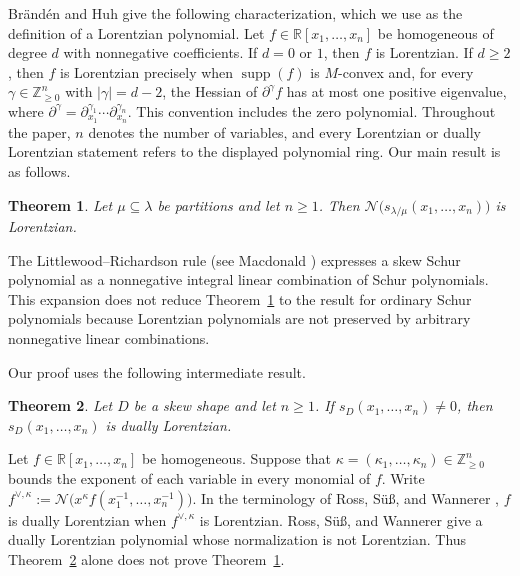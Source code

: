 \documentclass[11pt]{article}
\newtheorem{theorem}{Theorem}[section]
\theoremstyle{definition}
\newcommand{\Nop}{\mathcal N}
\newcommand{\R}{\mathbb R}
\newcommand{\Znonneg}{\mathbb Z_{\ge0}}
\newcommand{\supp}{\operatorname{supp}}
\begin{document}
Br\"and\'en and Huh
\cite[Definition~2.6 and Theorem~2.25]{BH} give the following characterization,
which we use as the definition of a Lorentzian polynomial.  Let
$f\in\R[x_1,\ldots,x_n]$ be homogeneous of degree $d$ with nonnegative
coefficients.  If $d=0$ or $1$, then $f$ is Lorentzian.  If $d\ge2$, then $f$
is Lorentzian precisely when $\supp(f)$ is $M$-convex and, for every
$\gamma\in\Znonneg^n$ with $|\gamma|=d-2$, the Hessian of
$\partial^\gamma f$ has at most one positive eigenvalue, where
$\partial^\gamma=\partial_{x_1}^{\gamma_1}\cdots
\partial_{x_n}^{\gamma_n}$.  This convention includes the zero polynomial.
Throughout the paper, $n$ denotes the number of variables, and every
Lorentzian or dually Lorentzian statement refers to the displayed polynomial
ring.  Our main result is as follows.

\begin{theorem}\label{thm:main}
Let $\mu\subseteq\lambda$ be partitions and let $n\ge1$.  Then
$\Nop\bigl(s_{\lambda/\mu}(x_1,\ldots,x_n)\bigr)$ is Lorentzian.
\end{theorem}

The Littlewood--Richardson rule (see Macdonald
\cite[Chapter~I]{Macdonald}) expresses a skew Schur polynomial as a
nonnegative integral linear combination of Schur polynomials.  This expansion
does not reduce Theorem~\ref{thm:main} to the result for ordinary Schur
polynomials because Lorentzian polynomials are not preserved by arbitrary
nonnegative linear combinations.

Our proof uses the following intermediate result.

\begin{theorem}\label{thm:dual-intro}
Let $D$ be a skew shape and let $n\ge1$.  If
$s_D(x_1,\ldots,x_n)\ne0$, then $s_D(x_1,\ldots,x_n)$ is dually
Lorentzian.
\end{theorem}

Let $f\in\R[x_1,\ldots,x_n]$ be homogeneous.  Suppose that
$\kappa=(\kappa_1,\ldots,\kappa_n)\in\Znonneg^n$ bounds the exponent of each
variable in every monomial of $f$.  Write
$f^{\vee,\kappa}:=\Nop\bigl(x^\kappa
f(x_1^{-1},\ldots,x_n^{-1})\bigr)$.  In the terminology of Ross, S\"u\ss,
and Wannerer \cite[Definition~4.2]{RSW}, $f$ is dually Lorentzian when
$f^{\vee,\kappa}$ is Lorentzian.  Ross, S\"u\ss, and Wannerer
\cite[Example~4.8]{RSW} give a dually Lorentzian polynomial whose
normalization is not Lorentzian.  Thus
Theorem~\ref{thm:dual-intro} alone does not prove Theorem~\ref{thm:main}.
\end{document}
